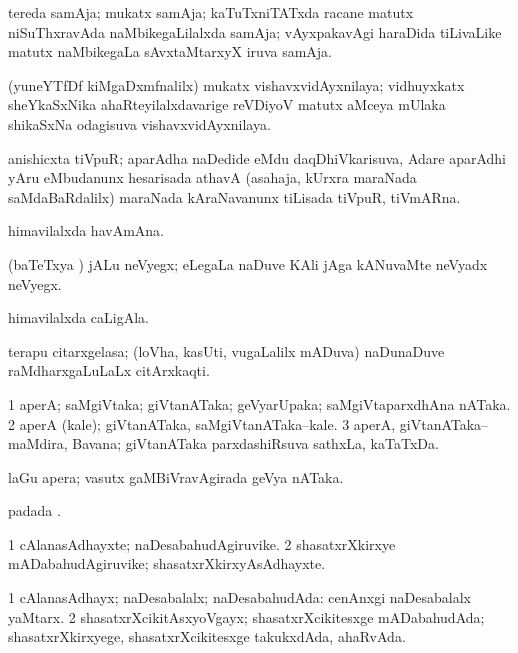 \bentry
{}
\gl{\nA}
\bmng
tereda samAja; mukatx samAja; kaTuTxniTATxda racane matutx niSuThxravAda naMbikegaLilalxda samAja; vAyxpakavAgi haraDida tiLivaLike matutx naMbikegaLa sAvxtaMtarxyX iruva samAja. 
\emng
\eentry


\bentry
{}
\gl{\nA}
\bmng
(yuneYTfDf kiMgaDxmfnalilx) mukatx vishavxvidAyxnilaya; vidhuyxkatx sheYkaSxNika ahaRteyilalxdavarige reVDiyoV matutx aMceya mUlaka shikaSxNa odagisuva vishavxvidAyxnilaya. 
\emng
\eentry

\bentry
{}
\gl{\nA}
\bmng
anishicxta tiVpuR; aparAdha naDedide eMdu daqDhiVkarisuva, Adare aparAdhi yAru eMbudanunx hesarisada athavA (asahaja, kUrxra maraNada saMdaBaRdalilx) maraNada kAraNavanunx tiLisada tiVpuR, tiVmARna. 
\emng
\eentry

\bentry
{}
\gl{\nA}
\bmng
himavilalxda havAmAna. 
\emng
\eentry

\bentry
{}
\gl{\nA}
\bmng
(baTeTxya \vi) jALu neVyegx; eLegaLa naDuve KAli jAga kANuvaMte neVyadx neVyegx. 
\emng
\eentry

\bentry
{}
\gl{\nA}
\bmng
himavilalxda caLigAla. 
\emng
\eentry

\bentry
{}
\gl{\nA}
\bmng
terapu citarxgelasa; (loVha, kasUti, \mo vugaLalilx mADuva) naDunaDuve raMdharxgaLuLaLx citArxkaqti. 
\emng
\eentry

\bentry
{}
\gl{\nA}
\bmng
\bnum
\num{1} aperA; saMgiVtaka; giVtanATaka; geVyarUpaka; saMgiVtaparxdhAna nATaka. 
\num{2} aperA (kale); giVtanATaka, saMgiVtanATaka--kale. 
\num{3} aperA, giVtanATaka--maMdira, Bavana; giVtanATaka parxdashiRsuva sathxLa, kaTaTxDa. 
\enum
\emng

\noindent
\gl{\pagu}
\bmng
{} laGu apera; vasutx gaMBiVravAgirada geVya nATaka. 
\emng
\eentry

\bentry
{}
\gl{\nA}
\bmng
{} padada \bava. 
\emng
\eentry

\bentry
{}
\gl{\nA}
\bmng
\bnum
\num{1} cAlanasAdhayxte; naDesabahudAgiruvike. 
\num{2} shasatxrXkirxye mADabahudAgiruvike; shasatxrXkirxyAsAdhayxte. 
\enum
\emng
\eentry

\bentry
{}
\gl{\gu}
\bmng
\bnum
\num{1} cAlanasAdhayx; naDesabalalx; naDesabahudAda:  cenAnxgi naDesabalalx yaMtarx. 
\num{2} shasatxrXcikitAsxyoVgayx; shasatxrXcikitesxge mADabahudAda; shasatxrXkirxyege, shasatxrXcikitesxge takukxdAda, ahaRvAda. 
\enum
\emng
\eentry

